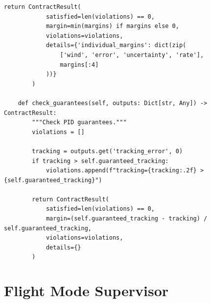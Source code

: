 \begin{lstlisting}[caption={PID controller contract implementation}, label=lst:pid_contract]
        return ContractResult(
            satisfied=len(violations) == 0,
            margin=min(margins) if margins else 0,
            violations=violations,
            details={'individual_margins': dict(zip(
                ['wind', 'error', 'uncertainty', 'rate'],
                margins[:4]
            ))}
        )

    def check_guarantees(self, outputs: Dict[str, Any]) -> ContractResult:
        """Check PID guarantees."""
        violations = []

        tracking = outputs.get('tracking_error', 0)
        if tracking > self.guaranteed_tracking:
            violations.append(f"tracking={tracking:.2f} > {self.guaranteed_tracking}")

        return ContractResult(
            satisfied=len(violations) == 0,
            margin=(self.guaranteed_tracking - tracking) / self.guaranteed_tracking,
            violations=violations,
            details={}
        )
\end{lstlisting}

\section{Flight Mode Supervisor}

